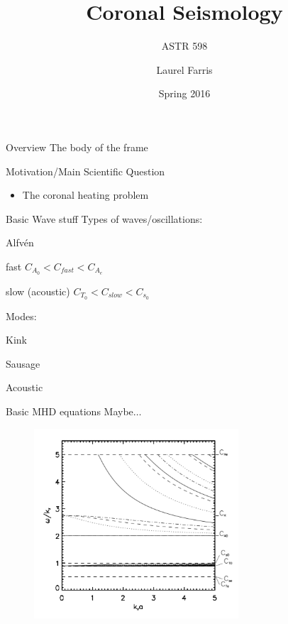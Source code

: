 \documentclass[table]{beamer}
\title{Coronal Seismology}
\subtitle{ASTR 598}
\date{Spring 2016}
\author{Laurel Farris}
\begin{document}
\begin{frame}
    \titlepage
\end{frame}

\begin{frame}{Overview}
    The body of the frame
\end{frame}

\begin{frame}{Motivation/Main Scientific Question}
    \begin{itemize}
        \item The coronal heating problem
    \end{itemize}
\end{frame}

\begin{frame}{Basic Wave stuff}
    Types of waves/oscillations:
    \begin{itemize*}
        \item Alfv\'en
        \item fast $C_{A_0} < C_{fast} < C_{A_e} $
        \item slow (acoustic) $C_{T_0} < C_{slow} < C_{s_0} $
    \end{itemize*}
    Modes:
    \begin{itemize*}
        \item Kink
        \item Sausage
        \item Acoustic
    \end{itemize*}
\end{frame}

\begin{frame}{Basic MHD equations}
    Maybe$\ldots$
\end{frame}

\begin{frame}
    \begin{figure}
        \includegraphics[width=3in]{disp_diagram.png}
    \end{figure}
\end{frame}
\end{document}
